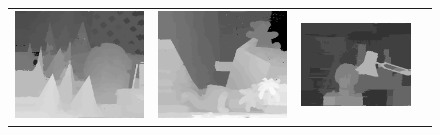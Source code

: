 \documentclass{article}
\begin{document}
\begin{figure}[h]
\begin{center}
\begin{tabular}{cccc}
 \includegraphics[scale=0.23]{Images/practical_results/cones.png} &
\includegraphics[scale=0.23]{Images/practical_results/teddy.png} &
\includegraphics[scale=0.298]{Images/practical_results/tsukuba.png} &

\end{tabular}
\end{center}
\end{figure}
\end{document}
